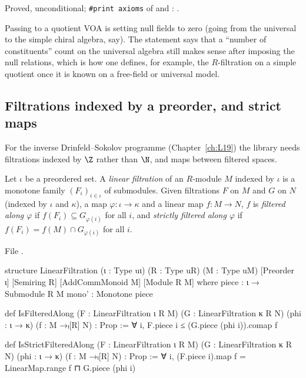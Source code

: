 \begin{status}
Proved, unconditional; \texttt{\#print axioms} of \allowbreak{}\allowbreak{} and
\allowbreak{}\allowbreak{}\allowbreak{}: \lean{[propext, Classical.}\allowbreak{}\allowbreak\lean{sound]}.
\end{status}

\begin{physics}
Passing to a quotient VOA is setting null fields to zero (going from the universal to the simple
chiral algebra, say). The statement says that a ``number of constituents'' count on the universal
algebra still makes sense after imposing the null relations, which is how one defines, for example,
the $R$-filtration on a simple quotient once it is known on a free-field or universal model.
\end{physics}

\subsection{Filtrations indexed by a preorder, and strict maps}

For the inverse Drinfeld--Sokolov programme (Chapter~\ref{ch:L19}) the library needs filtrations
indexed by $\Z$ rather than $\N$, and maps between filtered spaces.

\begin{definition}\label{l11:def:linfilt}
Let $\iota$ be a preordered set. A \emph{linear filtration} of an $R$-module $M$ indexed by $\iota$ is
a monotone family $(F_i)_{i\in\iota}$ of submodules. Given filtrations $F$ on $M$ and $G$ on $N$
(indexed by $\iota$ and $\kappa$), a map $\varphi:\iota\to\kappa$ and a linear map $f:M\to N$, $f$ is
\emph{filtered along $\varphi$} if $f(F_i)\subseteq G_{\varphi(i)}$ for all $i$, and \emph{strictly
filtered along $\varphi$} if $f(F_i) = f(M)\cap G_{\varphi(i)}$ for all $i$.
\end{definition}
\noindent File .
\begin{leancode}
structure LinearFiltration (ι : Type uι) (R : Type uR) (M : Type uM)
    [Preorder ι] [Semiring R] [AddCommMonoid M] [Module R M] where
  piece : ι → Submodule R M
  mono' : Monotone piece

def IsFilteredAlong (F : LinearFiltration ι R M) (G : LinearFiltration κ R N)
    (phi : ι → κ) (f : M →ₗ[R] N) : Prop :=
  ∀ i, F.piece i ≤ (G.piece (phi i)).comap f

def IsStrictFilteredAlong (F : LinearFiltration ι R M) (G : LinearFiltration κ R N)
    (phi : ι → κ) (f : M →ₗ[R] N) : Prop :=
  ∀ i, (F.piece i).map f = LinearMap.range f ⊓ G.piece (phi i)
\end{leancode}

